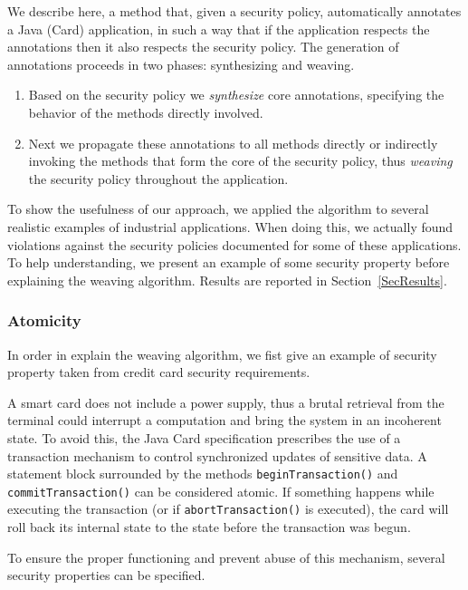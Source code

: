 We describe here, a method that, given a security policy,
automatically annotates a Java (Card) application, in such a way that
if the application respects the annotations then it also respects the
security policy. The generation of annotations proceeds in two phases:
synthesizing and weaving.
\begin{enumerate}
\item Based on the security policy we \emph{synthesize} core annotations, 
specifying the behavior of the methods directly involved.
\item Next we propagate these annotations to all methods directly or
indirectly invoking the methods that form the core of the security
policy, thus \emph{weaving} the security policy throughout the
application. 
\end{enumerate} 

To show the usefulness of our approach, we applied the algorithm to
several realistic examples of industrial applications. When doing
this, we actually found violations against the security policies
documented for some of these applications. To help understanding, we present an example of some security property before explaining the weaving algorithm. Results are reported in Section~\ref{SecResults}.

\subsubsection{Atomicity}\label{SecHighLevelSecProp}
In order in explain the weaving algorithm, we fist give an example of security property taken from credit card security requirements.  

A smart card does not include a power supply, thus a brutal retrieval
from the terminal could interrupt a computation and bring the system in
an incoherent state. To avoid this, the Java Card
specification prescribes the use of a transaction mechanism to
control synchronized updates of sensitive data. A 
statement block surrounded by the methods \texttt{beginTransaction()} and
\texttt{commitTransaction()} can be considered atomic.
If something happens while executing the transaction (or if
\texttt{abortTransaction()} is executed), the card will
roll back its internal state to the state before the transaction was
begun.

To ensure the proper functioning and prevent abuse of this mechanism,
several security properties can be specified.

